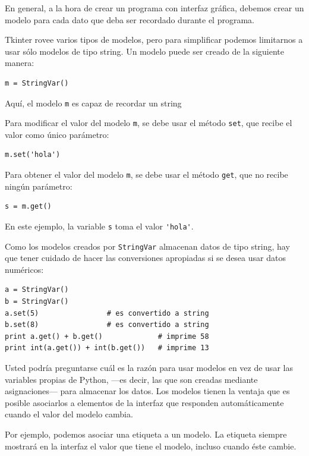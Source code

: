 En general, a la hora de crear un programa con interfaz gráfica, debemos
crear un modelo para cada dato que deba ser recordado durante el
programa.

Tkinter rovee varios tipos de modelos, pero para simplificar podemos
limitarnos a usar sólo modelos de tipo string. Un modelo puede ser
creado de la siguiente manera:

\begin{lstlisting}
m = StringVar()
\end{lstlisting}

Aquí, el modelo \lstinline!m! es capaz de recordar un string

Para modificar el valor del modelo \lstinline!m!, se debe usar el método
\lstinline!set!, que recibe el valor como único parámetro:

\begin{lstlisting}
m.set('hola')
\end{lstlisting}

Para obtener el valor del modelo \lstinline!m!, se debe usar el método
\lstinline!get!, que no recibe ningún parámetro:

\begin{lstlisting}
s = m.get()
\end{lstlisting}

En este ejemplo, la variable \lstinline!s! toma el valor
\lstinline!'hola'!.

Como los modelos creados por \lstinline!StringVar! almacenan datos de
tipo string, hay que tener cuidado de hacer las conversiones apropiadas
si se desea usar datos numéricos:

\begin{lstlisting}
a = StringVar()
b = StringVar()
a.set(5)                # es convertido a string
b.set(8)                # es convertido a string
print a.get() + b.get()             # imprime 58
print int(a.get()) + int(b.get())   # imprime 13
\end{lstlisting}

Usted podría preguntarse cuál es la razón para usar modelos en vez de
usar las variables propias de Python, ---es decir, las que son creadas
mediante asignaciones--- para almacenar los datos. Los modelos tienen la
ventaja que es posible asociarlos a elementos de la interfaz que
responden automáticamente cuando el valor del modelo cambia.

Por ejemplo, podemos asociar una etiqueta a un modelo. La etiqueta
siempre mostrará en la interfaz el valor que tiene el modelo, incluso
cuando éste cambie.

